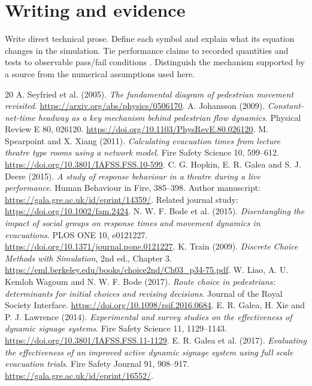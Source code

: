 \documentclass[11pt,a4paper]{article}
\begin{document}
\section*{Writing and evidence}
Write direct technical prose. Define each symbol and explain what its equation changes in the simulation. Tie performance claims to recorded quantities and tests to observable pass/fail conditions \cite{writing,nasa}. Distinguish the mechanism supported by a source from the numerical assumptions used here.

\clearpage
\begin{thebibliography}{20}\footnotesize\setlength{\itemsep}{3pt}\setlength{\parskip}{0pt}
 A. Seyfried et al. (2005). \emph{The fundamental diagram of pedestrian movement revisited}. \url{https://arxiv.org/abs/physics/0506170}.
 A. Johansson (2009). \emph{Constant-net-time headway as a key mechanism behind pedestrian flow dynamics}. Physical Review E 80, 026120. \url{https://doi.org/10.1103/PhysRevE.80.026120}.
 M. Spearpoint and X. Xiang (2011). \emph{Calculating evacuation times from lecture theatre type rooms using a network model}. Fire Safety Science 10, 599--612. \url{https://doi.org/10.3801/IAFSS.FSS.10-599}.
 C. G. Hopkin, E. R. Galea and S. J. Deere (2015). \emph{A study of response behaviour in a theatre during a live performance}. Human Behaviour in Fire, 385--398. Author manuscript: \url{https://gala.gre.ac.uk/id/eprint/14359/}. Related journal study: \url{https://doi.org/10.1002/fam.2424}.
 N. W. F. Bode et al. (2015). \emph{Disentangling the impact of social groups on response times and movement dynamics in evacuations}. PLOS ONE 10, e0121227. \url{https://doi.org/10.1371/journal.pone.0121227}.
 K. Train (2009). \emph{Discrete Choice Methods with Simulation}, 2nd ed., Chapter 3. \url{https://eml.berkeley.edu/books/choice2nd/Ch03_p34-75.pdf}.
 W. Liao, A. U. Kemloh Wagoum and N. W. F. Bode (2017). \emph{Route choice in pedestrians: determinants for initial choices and revising decisions}. Journal of the Royal Society Interface. \url{https://doi.org/10.1098/rsif.2016.0684}.
 E. R. Galea, H. Xie and P. J. Lawrence (2014). \emph{Experimental and survey studies on the effectiveness of dynamic signage systems}. Fire Safety Science 11, 1129--1143. \url{https://doi.org/10.3801/IAFSS.FSS.11-1129}.
 E. R. Galea et al. (2017). \emph{Evaluating the effectiveness of an improved active dynamic signage system using full scale evacuation trials}. Fire Safety Journal 91, 908--917. \url{https://gala.gre.ac.uk/id/eprint/16552/}.

\end{thebibliography}
\end{document}
